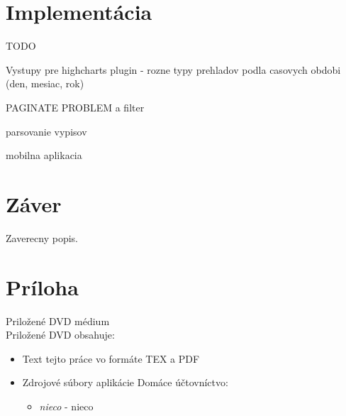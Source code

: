 \documentclass[12pt,oneside]{book}
\begin{document}
\chapter{Implementácia}
TODO

Vystupy pre highcharts plugin - rozne typy prehladov podla casovych obdobi (den, mesiac, rok)

PAGINATE PROBLEM a filter

parsovanie vypisov

mobilna aplikacia


\chapter{Záver}\label{chap:outro}
 
Zaverecny popis.

\backmatter

\nocite{*}




\newcommand{\dbappendix}[1]{\chapter{#1}}
\appendix
\dbappendix{Príloha}\label{appA}
{\large Priložené DVD médium}\\

Priložené DVD obsahuje:\\
\begin{itemize}
\item Text tejto práce vo formáte TEX a PDF
\item Zdrojové súbory aplikácie Domáce účtovníctvo:
	\begin{itemize}
		\item {\em nieco} - nieco
	\end{itemize}
\end{itemize}
\end{document}
